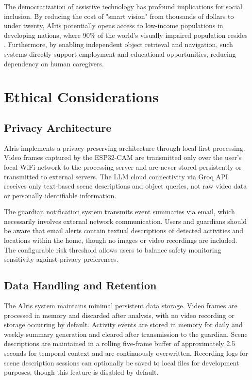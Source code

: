 \documentclass[12pt,a4paper]{report}
\begin{document}
The democratization of assistive technology has profound implications for social inclusion. By reducing the cost of "smart vision" from thousands of dollars to under twenty, AIris potentially opens access to low-income populations in developing nations, where 90\% of the world's visually impaired population resides \cite{who2023}. Furthermore, by enabling independent object retrieval and navigation, such systems directly support employment and educational opportunities, reducing dependency on human caregivers.

\section{Ethical Considerations}

\subsection{Privacy Architecture}

AIris implements a privacy-preserving architecture through local-first processing. Video frames captured by the ESP32-CAM are transmitted only over the user's local WiFi network to the processing server and are never stored persistently or transmitted to external servers. The LLM cloud connectivity via Groq API receives only text-based scene descriptions and object queries, not raw video data or personally identifiable information.

The guardian notification system transmits event summaries via email, which necessarily involves external network communication. Users and guardians should be aware that email alerts contain textual descriptions of detected activities and locations within the home, though no images or video recordings are included. The configurable risk threshold allows users to balance safety monitoring sensitivity against privacy preferences.

\subsection{Data Handling and Retention}

The AIris system maintains minimal persistent data storage. Video frames are processed in memory and discarded after analysis, with no video recording or storage occurring by default. Activity events are stored in memory for daily and weekly summary generation and cleared after transmission to the guardian. Scene descriptions are maintained in a rolling five-frame buffer of approximately 2.5 seconds for temporal context and are continuously overwritten. Recording logs for scene description sessions can optionally be saved to local files for development purposes, though this feature is disabled by default.
\end{document}
